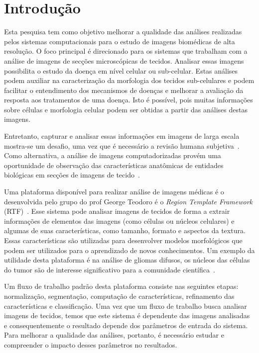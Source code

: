 \documentclass[a4paper,10pt]{article}
\begin{document}
	
	
\section{Introdução}


Esta pesquisa tem como objetivo melhorar a qualidade das análises realizadas pelos sistemas computacionais para o estudo de imagens biomédicas de alta resolução. O foco principal é direcionado para os sistemas que trabalham com a análise de imagens de secções microscópicas de tecidos. Analisar essas imagens possibilita o estudo da doença em nível celular ou sub-celular. Estas análises podem auxiliar na caracterização da morfologia dos tecidos sub-celulares e podem facilitar o entendimento dos mecanismos de doenças e melhorar a avaliação da resposta aos tratamentos de uma doença. Isto é possível, pois muitas informações sobre células e morfologia celular podem ser obtidas a partir das análises destas imagens.

Entretanto, capturar e analisar essas informações em imagens de larga escala mostra-se um desafio, uma vez que é necessário a revisão humana subjetiva~\cite{kong2011comprehensive}. Como alternativa, a análise de imagens computadorizadas provém uma oportunidade de observação das características anatômicas de entidades biológicas em secções de imagens de tecido~\cite{kong2010texture}.

Uma plataforma disponível para realizar análise de imagens médicas é o desenvolvida pelo grupo do prof George Teodoro é o \textit{Region Template Framework} (RTF)~\cite{teodoro2014region}. Esse sistema pode analisar imagens de tecidos de forma a extrair informações de elementos das imagens (como células ou núcleos celulares) e algumas de suas características, como tamanho, formato e aspectos da textura. Essas características são utilizadas para desenvolver modelos morfológicos que podem ser utilizados para o aprendizado de novos conhecimentos. Um exemplo da utilidade desta plataforma é na análise de gliomas difusos, os núcleos das células do tumor são de interesse significativo para a comunidade científica~\cite{gupta2005clarifying}.

Um fluxo de trabalho padrão desta plataforma consiste nas seguintes etapas: normalização, segmentação, computação de características, refinamento das características e classificação. Uma vez que um fluxo de trabalho busca analisar imagens de tecidos, temos que este sistema é dependente das imagens analisadas e consequentemente o resultado depende dos parâmetros de entrada do sistema. Para melhorar a qualidade das análises, portanto, é necessário estudar e compreender o impacto desses parâmetros no resultados. 
\end{document}

